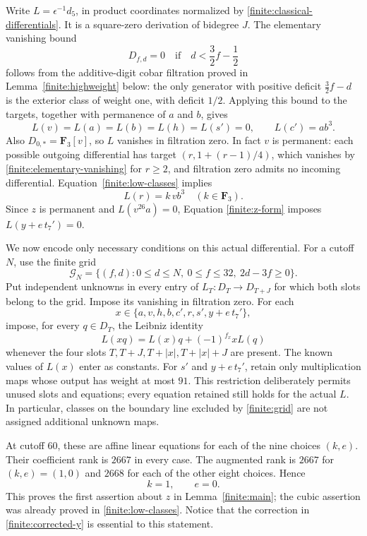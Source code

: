 \documentclass[11pt]{article}
\theoremstyle{definition}
\theoremstyle{remark}
\numberwithin{equation}{section}
\begin{document}
Write $L=\epsilon^{-1}d_5$, in product coordinates normalized by
\eqref{finite:classical-differentials}.  It is a square-zero
derivation of bidegree $J$.  The elementary vanishing bound
\begin{equation}\label{finite:elementary-vanishing}
 D_{f,d}=0\quad\text{if}\quad d<\frac32f-\frac12
\end{equation}
follows from the additive-digit cobar filtration proved in
Lemma~\ref{finite:highweight} below: the only generator with positive
deficit $\frac32f-d$ is the exterior class of weight one, with
deficit $1/2$.  Applying this bound to the targets, together with
permanence of $a$ and $b$, gives
\[
 L(v)=L(a)=L(b)=L(h)=L(s')=0,\qquad L(c')=ab^3.
\]
Also $D_{0,*}=\mathbf F_3[v]$, so $L$ vanishes in filtration zero.
In fact $v$ is permanent: each possible outgoing differential has
target $(r,1+(r-1)/4)$, which vanishes by
\eqref{finite:elementary-vanishing} for $r\geq2$, and filtration
zero admits no incoming differential.
Equation~\eqref{finite:low-classes} implies
\[
 L(r)=k\,vb^3\quad(k\in\mathbf F_3).
\]
Since $z$ is permanent and $L(v^{26}a)=0$, Equation
\eqref{finite:z-form} imposes $L(y+e\,t_7')=0$.

We now encode only necessary conditions on this actual differential.
For a cutoff $N$, use the finite grid
\begin{equation}\label{finite:grid}
 \mathcal G_N=\{(f,d):0\leq d\leq N,\ 0\leq f\leq32,
                                  \ 2d-3f\geq0\}.
\end{equation}
Put independent unknowns in every entry of
$L_T\colon D_T\longrightarrow D_{T+J}$ for which both slots belong
to the grid.  Impose its vanishing in filtration zero.  For each
\[
 x\in\{a,v,h,b,c',r,s',y+e\,t_7'\},
\]
impose, for every $q\in D_T$, the Leibniz identity
\begin{equation}\label{finite:leibniz-equations}
 L(xq)=L(x)q+(-1)^{f_x}xL(q)
\end{equation}
whenever the four slots $T,T+J,T+|x|,T+|x|+J$ are present.  The
known values of $L(x)$ enter as constants.  For $s'$ and
$y+e\,t_7'$, retain only multiplication maps whose output has
weight at most $91$.  This restriction deliberately permits unused
slots and equations; every equation retained still holds for the
actual $L$.  In particular, classes on the boundary line excluded
by \eqref{finite:grid} are not assigned additional unknown maps.

At cutoff $60$, these are affine linear equations for each of the
nine choices $(k,e)$.  Their coefficient rank is $2667$ in every
case.  The augmented rank is $2667$ for $(k,e)=(1,0)$ and $2668$
for each of the other eight choices.  Hence
\begin{equation}\label{finite:forced-values}
 k=1,\qquad e=0.
\end{equation}
This proves the first assertion about $z$ in
Lemma~\ref{finite:main}; the cubic assertion was already proved in
\eqref{finite:low-classes}.  Notice that the correction in
\eqref{finite:corrected-y} is essential to this statement.
\end{document}
